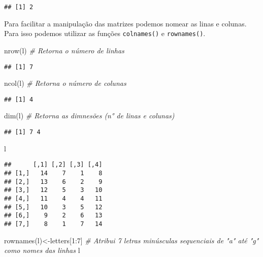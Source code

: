 \documentclass[
]{book}
\newenvironment{Shaded}{\begin{snugshade}}{\end{snugshade}}
\newcommand{\CommentTok}[1]{\textcolor[rgb]{0.56,0.35,0.01}{\textit{#1}}}
\newcommand{\DecValTok}[1]{\textcolor[rgb]{0.00,0.00,0.81}{#1}}
\newcommand{\FunctionTok}[1]{\textcolor[rgb]{0.00,0.00,0.00}{#1}}
\newcommand{\NormalTok}[1]{#1}
\newcommand{\OtherTok}[1]{\textcolor[rgb]{0.56,0.35,0.01}{#1}}
\newcommand{\SpecialCharTok}[1]{\textcolor[rgb]{0.00,0.00,0.00}{#1}}
\begin{document}
\begin{verbatim}
## [1] 2
\end{verbatim}

Para facilitar a manipulação das matrizes podemos nomear as linas e colunas. Para isso podemos utilizar as funções \texttt{colnames()} e \texttt{rownames()}.

\begin{Shaded}
\begin{Highlighting}[]
\FunctionTok{nrow}\NormalTok{(l) }\CommentTok{\# Retorna o número de linhas}
\end{Highlighting}
\end{Shaded}

\begin{verbatim}
## [1] 7
\end{verbatim}

\begin{Shaded}
\begin{Highlighting}[]
\FunctionTok{ncol}\NormalTok{(l) }\CommentTok{\# Retorna o número de colunas}
\end{Highlighting}
\end{Shaded}

\begin{verbatim}
## [1] 4
\end{verbatim}

\begin{Shaded}
\begin{Highlighting}[]
\FunctionTok{dim}\NormalTok{(l) }\CommentTok{\# Retorna as dimnesões (n° de linas e colunas)}
\end{Highlighting}
\end{Shaded}

\begin{verbatim}
## [1] 7 4
\end{verbatim}

\begin{Shaded}
\begin{Highlighting}[]
\NormalTok{l}
\end{Highlighting}
\end{Shaded}

\begin{verbatim}
##      [,1] [,2] [,3] [,4]
## [1,]   14    7    1    8
## [2,]   13    6    2    9
## [3,]   12    5    3   10
## [4,]   11    4    4   11
## [5,]   10    3    5   12
## [6,]    9    2    6   13
## [7,]    8    1    7   14
\end{verbatim}

\begin{Shaded}
\begin{Highlighting}[]
\FunctionTok{rownames}\NormalTok{(l)}\OtherTok{\textless{}{-}}\NormalTok{letters[}\DecValTok{1}\SpecialCharTok{:}\DecValTok{7}\NormalTok{] }\CommentTok{\# Atribui 7 letras minúsculas sequenciais de "a" até "g" como nomes das linhas}
\NormalTok{l}
\end{Highlighting}
\end{Shaded}
\end{document}
